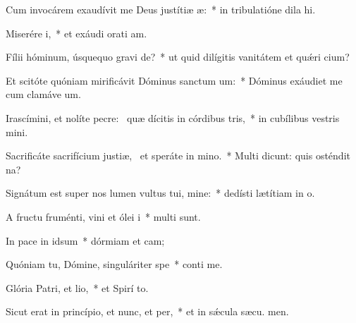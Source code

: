 \item Cum invocárem exaudívit me Deus justítiæ æ:~* in tribulatióne dila hi.
\item Miserére i,~* et exáudi orati am.
\item Fílii hóminum, úsquequo gravi de?~* ut quid dilígitis vanitátem et quǽri cium?
\item Et scitóte quóniam mirificávit Dóminus sanctum um:~* Dóminus exáudiet me cum clamáve  um.
\item Irascímini, et nolíte pecre:~\pscross{} quæ dícitis in córdibus tris,~* in cubílibus vestris mini.
\item Sacrificáte sacrifícium justiæ,~\pscross{} et speráte in mino.~* Multi dicunt: quis osténdit  na?
\item Signátum est super nos lumen vultus tui, mine:~* dedísti lætítiam in  o.
\item A fructu fruménti, vini et ólei i~* multi sunt.
\item In pace in idsum~* dórmiam et cam;
\item Quóniam tu, Dómine, singuláriter  spe~* conti me.
\item Glória Patri, et lio,~* et Spirí to.
\item Sicut erat in princípio, et nunc, et per,~* et in sǽcula sæcu. men.
